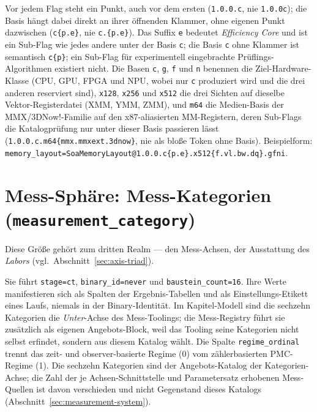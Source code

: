 Vor jedem Flag steht ein Punkt, auch vor dem ersten (\texttt{1.0.0.c}, nie \texttt{1.0.0c}); die Basis hängt dabei direkt an ihrer öffnenden Klammer, ohne eigenen Punkt dazwischen (\texttt{c\{p.e\}}, nie \texttt{c.\{p.e\}}). Das Suffix \texttt{e} bedeutet \emph{Efficiency Core} und ist ein Sub-Flag wie jedes andere unter der Basis \texttt{c}; die Basis \texttt{c} ohne Klammer ist semantisch \texttt{c\{p\}}; ein Sub-Flag für experimentell eingebrachte Prüflings-Algorithmen existiert nicht. Die Basen \texttt{c}, \texttt{g}, \texttt{f} und \texttt{n} benennen die Ziel-Hardware-Klasse (CPU, GPU, FPGA und NPU, wobei nur \texttt{c} produziert wird und die drei anderen reserviert sind), \texttt{x128}, \texttt{x256} und \texttt{x512} die drei Sichten auf dieselbe Vektor-Registerdatei (XMM, YMM, ZMM), und \texttt{m64} die Medien-Basis der MMX/3DNow!-Familie auf den x87-aliasierten MM-Registern, deren Sub-Flags die Katalogprüfung nur unter dieser Basis passieren lässt (\texttt{1.0.0.c.m64\{mmx.mmxext.3dnow\}}, nie als bloße Token ohne Basis). Beispielform: \texttt{memory\_\allowbreak{}layout=\allowbreak{}SoaMemoryLayout@\allowbreak{}1.0.0.c\{p.e\}.\allowbreak{}x512\{f.vl.bw.dq\}.\allowbreak{}gfni}.

\section{Mess-Sphäre: Mess-Kategorien (\texttt{measurement\_category})}

Diese Größe gehört zum dritten Realm --- den Mess-Achsen, der Ausstattung des \emph{Labors} (vgl.\ Abschnitt~\ref{sec:axis-triad}).

Sie führt \texttt{stage=ct}, \texttt{binary\_\allowbreak{}id=never} und \texttt{baustein\_\allowbreak{}count=16}. Ihre Werte manifestieren sich als Spalten der Ergebnis-Tabellen und als Einstellungs-Etikett eines Laufs, niemals in der Binary-Identität. Im Kapitel-Modell sind die sechzehn Kategorien die \emph{Unter}-Achse des Mess-Toolings; die Mess-Registry führt sie zusätzlich als eigenen Angebots-Block, weil das Tooling seine Kategorien nicht selbst erfindet, sondern aus diesem Katalog wählt. Die Spalte \texttt{regime\_\allowbreak{}ordinal} trennt das zeit- und observer-basierte Regime (0) vom zählerbasierten PMC-Regime (1). Die sechzehn Kategorien sind der Angebots-Katalog der Kategorien-Achse; die Zahl der je Achsen-Schnittstelle und Parametersatz erhobenen Mess-Quellen ist davon verschieden und nicht Gegenstand dieses Katalogs (Abschnitt~\ref{sec:measurement-system}).

